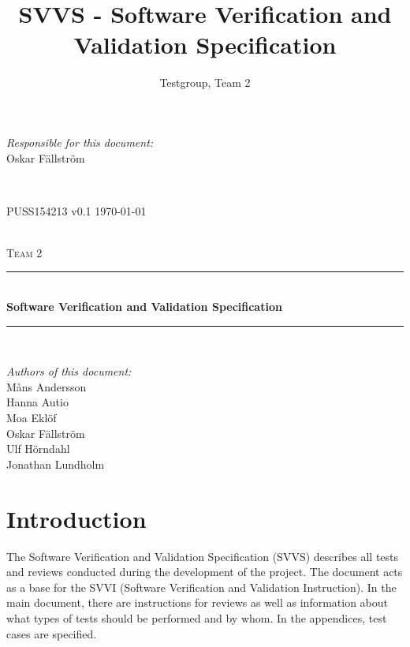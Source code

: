 \documentclass[a4paper]{article}
\title{SVVS - Software Verification and Validation Specification}
\author{Testgroup, Team 2}
\begin{document}
\begin{titlepage}
\newcommand{\HRule}{\rule{\linewidth}{0.5mm}}

\begin{minipage}{0.5\textwidth}
\begin{flushleft} %
\textit{Responsible for this document:}\\
Oskar Fällström %
\end{flushleft}
\end{minipage}
~
\begin{minipage}{0.4\textwidth}
\begin{flushright}
PUSS154213 v0.1 %
\today
\end{flushright}
\end{minipage}\\[3cm]

\centering
\textsc{\LARGE Team 2}\\[0.5cm]

\HRule \\[0.4cm]
{ \huge \bfseries Software Verification and Validation Specification}\\[0.4cm] %
\HRule \\[1.5cm]

\vfill
\begin{flushleft}
\textit{Authors of this document:}\\
Måns Andersson \\
Hanna Autio \\
Moa Eklöf \\
Oskar Fällström \\
Ulf Hörndahl \\
Jonathan Lundholm
\end{flushleft}


\end{titlepage}
\setcounter{tocdepth}{2}
\tableofcontents
\newpage
{}

\section{Introduction}
The Software Verification and Validation Specification (SVVS) describes all tests and reviews conducted during the development of the project. The document acts as a base for the SVVI (Software Verification and Validation Instruction).
In the main document, there are instructions for reviews as well as information about what types of tests should be performed and by whom. In the appendices, test cases are specified.
\end{document}
